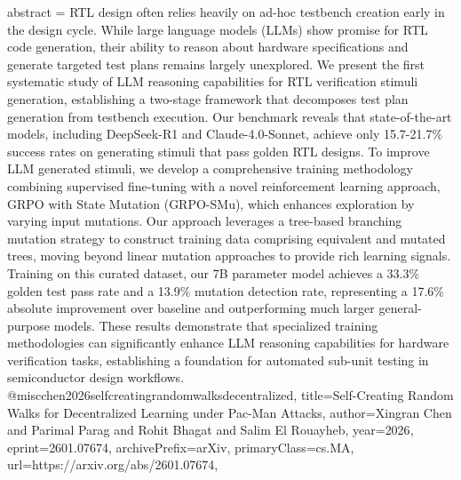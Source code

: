 {      abstract = {RTL design often relies heavily on ad-hoc testbench creation early in the design cycle. While large language models (LLMs) show promise for RTL code generation, their ability to reason about hardware specifications and generate targeted test plans remains largely unexplored. We present the first systematic study of LLM reasoning capabilities for RTL verification stimuli generation, establishing a two-stage framework that decomposes test plan generation from testbench execution. Our benchmark reveals that state-of-the-art models, including DeepSeek-R1 and Claude-4.0-Sonnet, achieve only 15.7-21.7\% success rates on generating stimuli that pass golden RTL designs. To improve LLM generated stimuli, we develop a comprehensive training methodology combining supervised fine-tuning with a novel reinforcement learning approach, GRPO with State Mutation (GRPO-SMu), which enhances exploration by varying input mutations. Our approach leverages a tree-based branching mutation strategy to construct training data comprising equivalent and mutated trees, moving beyond linear mutation approaches to provide rich learning signals. Training on this curated dataset, our 7B parameter model achieves a 33.3\% golden test pass rate and a 13.9\% mutation detection rate, representing a 17.6\% absolute improvement over baseline and outperforming much larger general-purpose models. These results demonstrate that specialized training methodologies can significantly enhance LLM reasoning capabilities for hardware verification tasks, establishing a foundation for automated sub-unit testing in semiconductor design workflows.}
}@misc{chen2026selfcreatingrandomwalksdecentralized,
      title={Self-Creating Random Walks for Decentralized Learning under Pac-Man Attacks}, 
      author={Xingran Chen and Parimal Parag and Rohit Bhagat and Salim El Rouayheb},
      year={2026},
      eprint={2601.07674},
      archivePrefix={arXiv},
      primaryClass={cs.MA},
      url={https://arxiv.org/abs/2601.07674},
}
